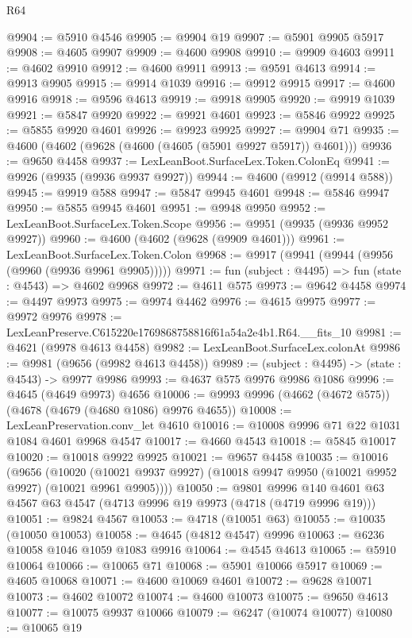 \begin{lexlean}{R64}
\begin{coremodule}
@9904 := @5910 @4546
@9905 := @9904 @19
@9907 := @5901 @9905 @5917
@9908 := @4605 @9907
@9909 := @4600 @9908
@9910 := @9909 @4603
@9911 := @4602 @9910
@9912 := @4600 @9911
@9913 := @9591 @4613
@9914 := @9913 @9905
@9915 := @9914 @1039
@9916 := @9912 @9915
@9917 := @4600 @9916
@9918 := @9596 @4613
@9919 := @9918 @9905
@9920 := @9919 @1039
@9921 := @5847 @9920
@9922 := @9921 @4601
@9923 := @5846 @9922
@9925 := @5855 @9920 @4601
@9926 := @9923 @9925
@9927 := @9904 @71
@9935 := @4600 (@4602 (@9628 (@4600 (@4605 (@5901 @9927 @5917)) @4601)))
@9936 := @9650 @4458
@9937 := LexLeanBoot.SurfaceLex.Token.ColonEq
@9941 := @9926 (@9935 (@9936 @9937 @9927))
@9944 := @4600 (@9912 (@9914 @588))
@9945 := @9919 @588
@9947 := @5847 @9945 @4601
@9948 := @5846 @9947
@9950 := @5855 @9945 @4601
@9951 := @9948 @9950
@9952 := LexLeanBoot.SurfaceLex.Token.Scope
@9956 := @9951 (@9935 (@9936 @9952 @9927))
@9960 := @4600 (@4602 (@9628 (@9909 @4601)))
@9961 := LexLeanBoot.SurfaceLex.Token.Colon
@9968 := @9917 (@9941 (@9944 (@9956 (@9960 (@9936 @9961 @9905)))))
@9971 := fun (subject : @4495) => fun (state : @4543) => @4602 @9968
@9972 := @4611 @575
@9973 := @9642 @4458
@9974 := @4497 @9973
@9975 := @9974 @4462
@9976 := @4615 @9975
@9977 := @9972 @9976
@9978 := LexLeanPreserve.C615220e1769868758816f61a54a2e4b1.R64.__fits_10
@9981 := @4621 (@9978 @4613 @4458)
@9982 := LexLeanBoot.SurfaceLex.colonAt
@9986 := @9981 (@9656 (@9982 @4613 @4458))
@9989 := (subject : @4495) -> (state : @4543) -> @9977 @9986
@9993 := @4637 @575 @9976 @9986 @1086
@9996 := @4645 (@4649 @9973) @4656
@10006 := @9993 @9996 (@4662 (@4672 @575)) (@4678 (@4679 (@4680 @1086) @9976 @4655))
@10008 := LexLeanPreservation.conv_let @4610
@10016 := @10008 @9996 @71 @22 @1031 @1084 @4601 @9968 @4547
@10017 := @4660 @4543
@10018 := @5845 @10017
@10020 := @10018 @9922 @9925
@10021 := @9657 @4458
@10035 := @10016
    (@9656
      (@10020 (@10021 @9937 @9927) (@10018 @9947 @9950 (@10021 @9952 @9927) (@10021 @9961 @9905))))
@10050 := @9801
    @9996
    @140
    @4601
    @63
    @4567
    @63
    @4547
    (@4713 @9996 @19 @9973 (@4718 (@4719 @9996 @19)))
@10051 := @9824 @4567
@10053 := @4718 (@10051 @63)
@10055 := @10035 (@10050 @10053)
@10058 := @4645 (@4812 @4547) @9996
@10063 := @6236 @10058 @1046 @1059 @1083 @9916
@10064 := @4545 @4613
@10065 := @5910 @10064
@10066 := @10065 @71
@10068 := @5901 @10066 @5917
@10069 := @4605 @10068
@10071 := @4600 @10069 @4601
@10072 := @9628 @10071
@10073 := @4602 @10072
@10074 := @4600 @10073
@10075 := @9650 @4613
@10077 := @10075 @9937 @10066
@10079 := @6247 (@10074 @10077)
@10080 := @10065 @19

\end{coremodule}
\end{lexlean}
